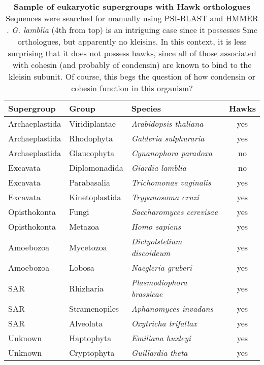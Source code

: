 \documentclass[a4paper,11pt,twoside,openright]{scrbook}
\begin{document}
\begin{table}[h]
    \captionsetup{width=0.85\linewidth}
    \caption[Sample of eukaryotic supergroups with Hawk orthologues]{\sffamily \textbf{Sample of eukaryotic supergroups with Hawk orthologues} \\ \small Sequences were searched for manually using PSI-BLAST and HMMER \cite{Altschul1997,Finn2011}. \textit{G. lamblia} (4th from top) is an intriguing case since it possesses Smc orthologues, but apparently no kleisins. In this context, it is less surprising that it does not possess hawks, since all of those associated with cohesin (and probably of condensin) are known to bind to the kleisin subunit. Of course, this begs the question of how condensin or cohesin function in this organism?}
    \centering
    \onehalfspacing
    \begin{tabular}{l l l c}
    \hline
    Supergroup  & Group   &  Species &   Hawks\\[0.1cm]
    \hline
Archaeplastida &   Viridiplantae  &   \textit{Arabidopsis thaliana}     &  yes\\
Archaeplastida &   Rhodophyta     &   \textit{Galderia sulphuraria}     &  yes\\
Archaeplastida &   Glaucophyta    &   \textit{Cynanophora paradoxa}     &  no\\
Excavata       &   Diplomonadida  &   \textit{Giardia lamblia}          &  no\\
Excavata       &   Parabasalia    &   \textit{Trichomonas vaginalis}    &  yes\\
Excavata       &   Kinetoplastida &   \textit{Trypanosoma cruzi}        &  yes\\
Opisthokonta   &   Fungi          &   \textit{Saccharomyces cerevisae}  &  yes\\
Opisthokonta   &   Metazoa        &   \textit{Homo sapiens}             &  yes\\
Amoebozoa      &   Mycetozoa      &   \textit{Dictyolstelium discoideum}&  yes\\
Amoebozoa      &   Lobosa         &   \textit{Naegleria gruberi}        &  yes\\
SAR            &   Rhizharia      &   \textit{Plasmodiophora brassicae} &  yes\\
SAR            &   Stramenopiles  &   \textit{Aphanomyces invadans}     &  yes\\
SAR            &   Alveolata      &   \textit{Oxytricha trifallax}      &  yes\\
Unknown        &   Haptophyta     &   \textit{Emiliana huxleyi}         &  yes\\
Unknown        &   Cryptophyta    &   \textit{Guillardia theta}         &  yes\\
[0.1cm]
    \hline
    \end{tabular}
    \label{table:eukaryotehawks}
\end{table}
\end{document}
